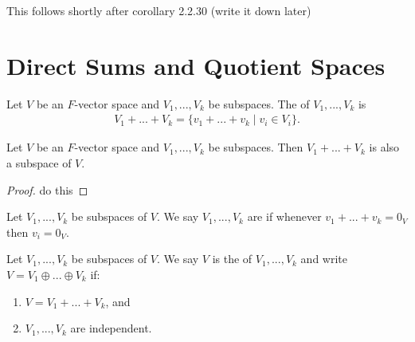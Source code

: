     \begin{example}
        {\color{red} This follows shortly after corollary 2.2.30 (write it down later)}
    \end{example}

\section{Direct Sums and Quotient Spaces}
    \begin{definition}
        Let $V$ be an $F$-vector space and $V_1,...,V_k$ be subspaces. The  of $V_1,...,V_k$ is 
            \begin{equation*}
            \begin{split}
                V_1 + ... + V_k = \{v_1 + ... + v_k \mid v_i \in V_i \}.
            \end{split}
            \end{equation*}
    \end{definition}

    \begin{proposition}
        Let $V$ be an $F$-vector space and $V_1,...,V_k$ be subspaces. Then $V_1 + ... + V_k$ is also a subspace of $V$.
    \end{proposition}
        \begin{proof}
            \color{red} do this
        \end{proof}
    
    \begin{definition}
        Let $V_1,...,V_k$ be subspaces of $V$. We say $V_1,...,V_k$ are  if whenever $v_1 + ... + v_k = 0_V$ then $v_i = 0_V$.
    \end{definition}
    
    \begin{definition}
        Let $V_1,...,V_k$ be subspaces of $V$. We say $V$ is the  of $V_1,...,V_k$ and write $V = V_1 \oplus ... \oplus V_k$ if:
            \begin{enumerate}[label = (\arabic*)]
                \item $V = V_1 + ... + V_k$, and
                \item $V_1,...,V_k$ are independent.
            \end{enumerate}
        \phantom{a}
    \end{definition}

